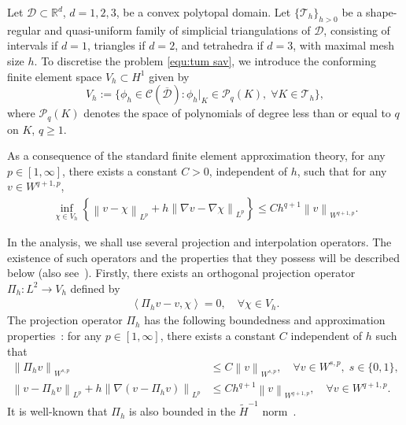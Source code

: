 \documentclass[11pt, reqno]{amsart}
\theoremstyle{definition}
\numberwithin{equation}{section}
\newcommand{\bff}{\boldsymbol}
\newcommand{\bb}{\mathbb}
\newcommand{\norm}[2]{\left\|{#1}\right\|_{#2}}
\newcommand{\inpro}[2]{\left\langle#1,#2\right\rangle}
\begin{document}
Let $\mathscr{D}\subset \mathbb{R}^d$, $d=1,2,3$, be a convex polytopal domain. Let $\{\mathcal{T}_h\}_{h>0}$ be a shape-regular and quasi-uniform family of simplicial triangulations of $\mathscr{D}$, consisting of intervals if $d=1$, triangles if $d=2$, and tetrahedra if $d=3$, with maximal mesh size $h$.
To discretise the problem \eqref{equ:tum sav}, we
introduce the conforming finite element space $V_h \subset H^1$ given by
\begin{equation}\label{equ:Vh}
	V_h := \{\phi_h \in \mathcal{C}(\overline{\mathscr{D}}): \phi_h|_K \in \mathcal{P}_q(K), \; \forall K \in \mathcal{T}_h\},
\end{equation}
where $\mathcal{P}_q(K)$ denotes the space of polynomials of degree less than or equal to $q$ on $K$, {$q\ge1$.}

As a consequence of the standard finite element approximation theory, for any $p\in [1,\infty]$, there exists a constant $C>0$, independent of $h$, such that for any $v\in W^{q+1,p}$,
\begin{align}\label{equ:fin approx}
	\inf_{\chi \in V_h} \left\{ \norm{v - \chi}{L^p} 
	+ 
	h \norm{\nabla v-\nabla \chi}{L^p} 
	\right\} 
	\leq 
	C h^{q+1} \norm{v}{W^{q+1,p}}.
\end{align}


In the analysis, we shall use several projection and interpolation operators. The existence of such operators and the properties that they possess will be described below (also see~\cite{BreSco08}).
Firstly, there exists an orthogonal projection operator $\Pi_h: L^2 \to V_h$ defined by
\begin{align}\label{equ:orth proj}
	\inpro{\Pi_h v-v}{\chi}=0,
	\quad
	\forall \chi \in V_h.
\end{align}
The projection operator $\Pi_h$ has the following boundedness and approximation properties~\cite{CroTho87, DouDupWah74}: for any $p\in [1,\infty]$, there exists a constant $C$ independent of $h$ such that
\begin{align}
	\label{equ:proj stable}
	\norm{\Pi_h v}{W^{s,p}}
	&\leq
	C \norm{v}{W^{s,p}}, \quad \forall v\in W^{s,p},\; s\in\{0,1\},
	\\
	\label{equ:proj approx}
	\norm{v- \Pi_h v}{L^p}
	+
	h \norm{\nabla( v-\Pi_h v)}{L^p}
	&\leq
	C h^{q+1} \norm{v}{W^{q+1,p}}, \quad \forall v\in W^{q+1,p}.
\end{align}
It is well-known that $\Pi_h$ is also bounded in the $\widetilde{H}^{-1}$ norm~\cite{CheMaoShe20}.
\end{document}
